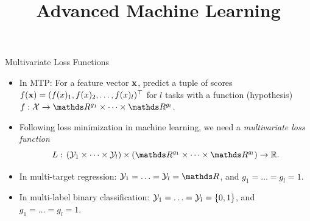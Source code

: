 \documentclass[11pt,compress,t,notes=noshow, xcolor=table]{beamer}
\title{Advanced Machine Learning}
\date{}
\begin{document}



\sloppy


\begin{frame}{Multivariate Loss Functions}
	\begin{itemize}
		\item In MTP: For a feature vector $\mathbf{x}$, predict a tuple of scores $f(\mathbf{x}) = (f(x)_1, f(x)_2, \ldots, f(x)_l)^\top$ for $l$ tasks with a function (hypothesis) $f: \Xspace \rightarrow \R^{g_1} \times \cdots \times \R^{g_l} $.
        
		\item Following loss minimization in machine learning, we need a \emph{multivariate loss function} 
		$$
		L: \, (\Yspace_1 \times \cdots \times \Yspace_l) \times (\R^{g_1} \times \cdots \times \R^{g_l}) \rightarrow \mathbb{R}.
		$$ 

        \item In multi-target regression: $\Yspace_1 = \ldots = \Yspace_l = \R$, and $g_1 = \ldots = g_l = 1$.

        \item In multi-label binary classification: $\mathcal{Y}_1 =  \ldots = \mathcal{Y}_l = \{0, 1\}$, and $g_1 = \ldots = g_l = 1$. %
	\end{itemize}
	
\end{frame}
\end{document}

